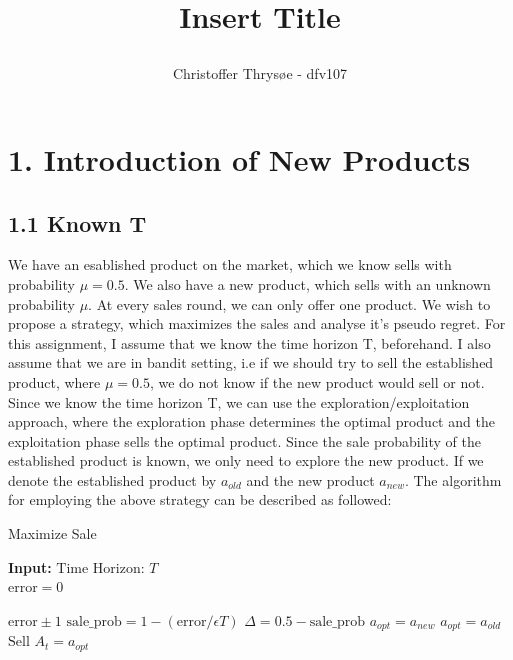 \documentclass{article}
\title{
\vspace{1in}
\textmd{\textbf{Insert Title}} \\
\author{Christoffer Thrysøe - dfv107}
}
\begin{document}
\maketitle
{}
\section{1. Introduction of New Products}
\subsection*{1.1 Known T}
We have an esablished product on the market, which we know sells with probability $\mu = 0.5$. We also have a new product, which sells with an unknown probability $\mu$. At every sales round, we can only offer one product. We wish to propose a strategy, which maximizes the sales and analyse it's pseudo regret. For this assignment, I assume that we know the time horizon T, beforehand. I also assume that we are in bandit setting, i.e if we should try to sell the established product, where $\mu=0.5$, we do not know if the new product would sell or not. \\
Since we know the time horizon T, we can use the exploration/exploitation approach, where the exploration phase determines the optimal product and the exploitation phase sells the optimal product. Since the sale probability of the established product is known, we only need to explore the new product. If we denote the established product by $a_{old}$ and the new product $a_{new}$.
The algorithm for employing the above strategy can be described as followed:
\begin{algorithm}[H]
\caption{Maximize Sale}
\hspace*{\algorithmicindent}\textbf{Input:} $\text{Time Horizon: } T$ \\
\hspace*{\algorithmicindent}$\text{error}=0$ 
\begin{algorithmic}[1]
\State {}
 \State $\text{error} \pm 1 $
\EndIf
\EndFor
\State $\text{sale\_prob} =  1 - \left(\text{error} / \epsilon T  \right)$
\State $\Delta = 0.5 - \text{sale\_prob}$
 \State $a_{opt} = a_{new}$
\Else \State $a_{opt} = a_{old}$
\EndIf
{}
\State $\text{Sell } A_t = a_{opt}$
\EndFor
\end{algorithmic}
\end{algorithm}
\end{document}
